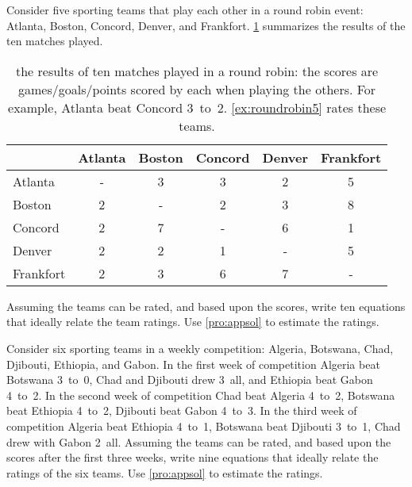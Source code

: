 \begin{exercise} \label{ex:roundrobin5} 
Consider five sporting teams that play each other in a round robin  event: Atlanta, Boston, Concord, Denver, and Frankfort.
\cref{tbl:roundrobin5} summarizes the results of the ten matches played.
\begin{table}
\caption{the results of ten matches played in a round robin: the scores are games\slash goals\slash points scored by each when playing the others.  For example, Atlanta beat Concord 3~to~2.  \cref{ex:roundrobin5} rates these teams.}
\label{tbl:roundrobin5}
\begin{center}
\begin{tabular}{@{}l|ccccc@{}} \hline
&Atlanta& Boston& Concord& Denver&Frankfort\\ \hline
Atlanta & - & 3 & 3 & 2 & 5 \\
Boston & 2 & - & 2 & 3 & 8 \\
Concord & 2 & 7 & - & 6 & 1 \\
Denver & 2 & 2 & 1 & - & 5 \\ 
Frankfort& 2 & 3 & 6 & 7 & - \\\hline
\end{tabular}
\end{center}
\end{table}%
Assuming the teams can be rated, and  based upon the scores, write ten equations that ideally relate the team ratings.  
Use \cref{pro:appsol} to estimate the ratings.
\end{exercise}




\begin{exercise} \label{ex:roundrobin6} 
Consider six sporting teams in a weekly competition: Algeria, Botswana, Chad, Djibouti, Ethiopia, and Gabon.
In the first week of competition 
Algeria beat Botswana 3~to~0, 
Chad and Djibouti drew 3~all, and 
Ethiopia beat Gabon 4~to~2.
In the second week of competition 
Chad beat Algeria 4~to~2, 
Botswana beat Ethiopia 4~to~2,
Djibouti beat Gabon 4~to~3.
In the third week of competition 
Algeria beat Ethiopia 4~to~1, 
Botswana beat Djibouti 3~to~1,
Chad drew with Gabon 2~all.
Assuming the teams can be rated, and  based upon the scores after the first three weeks, write nine equations that ideally relate the ratings of the six teams.  
Use \cref{pro:appsol} to estimate the ratings.
\end{exercise}



